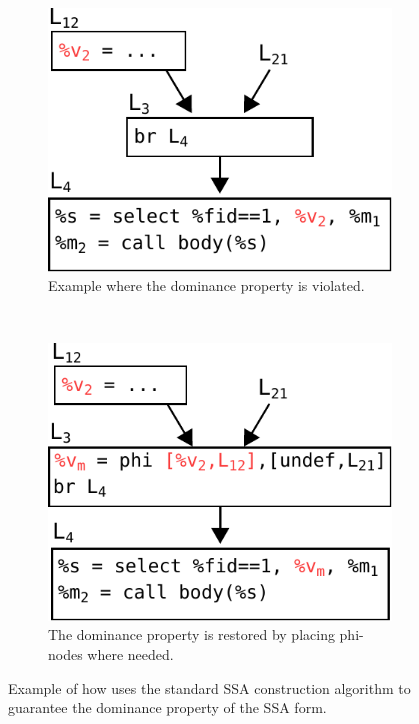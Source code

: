 \begin{figure}[t]
  \centering
  \begin{subfigure}{.5\textwidth}
    \center
    \includegraphics[scale=0.65]{src/merge-operation/figs/phi-placement-1}
    \caption{Example where the dominance property is violated.}
    \label{fig:phi-placement-1}
  \end{subfigure}
  \\
  \begin{subfigure}{.5\textwidth}
    \center
    \includegraphics[scale=0.65]{src/merge-operation/figs/phi-placement-2}
    \caption{The dominance property is restored by placing phi-nodes where needed.}
    \label{fig:phi-placement-2}
  \end{subfigure}
  \caption{Example of how {\ProjName} uses the standard SSA construction algorithm
           to guarantee the dominance property of the SSA form.}
  \label{fig:phi-placement}
\end{figure}


